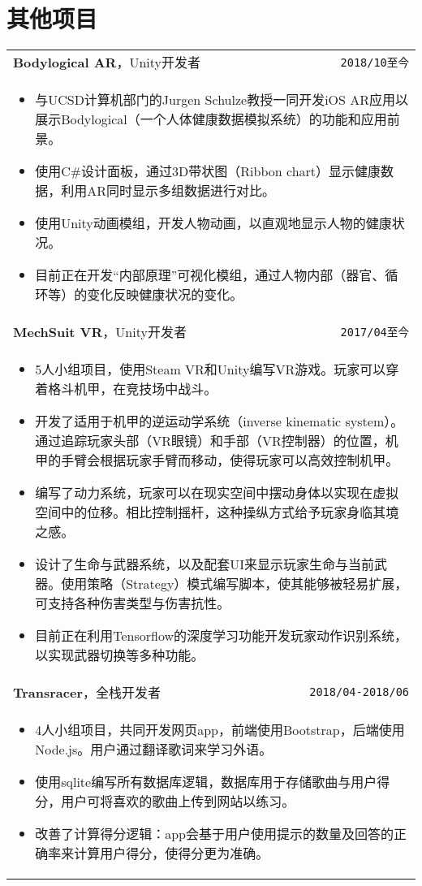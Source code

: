 \documentclass[UTF8]{ctexart}
\newcommand{\itemcols}[1]{
	\multicolumn{2}{p{\dimexpr \linewidth-2\tabcolsep}}{
		\begin{itemize}
			#1
		\end{itemize}
	}
}
\begin{document}
	\section{其他项目}
	\smallskip
	\noindent
	\begin{tabularx}{\linewidth}{X r}
		\textbf{\large Bodylogical AR}，Unity开发者 & \texttt{2018/10至今} \\
		\itemcols{
			\item 与UCSD计算机部门的Jurgen Schulze教授一同开发iOS AR应用以展示Bodylogical（一个人体健康数据模拟系统）的功能和应用前景。
			\item 使用C\#设计面板，通过3D带状图（Ribbon chart）显示健康数据，利用AR同时显示多组数据进行对比。
			\item 使用Unity动画模组，开发人物动画，以直观地显示人物的健康状况。
			\item 目前正在开发“内部原理”可视化模组，通过人物内部（器官、循环等）的变化反映健康状况的变化。
		} \\
		
		\textbf{\large MechSuit VR}，Unity开发者 & \texttt{2017/04至今} \\
		\itemcols{
			\item 5人小组项目，使用Steam VR和Unity编写VR游戏。玩家可以穿着格斗机甲，在竞技场中战斗。
			\item 开发了适用于机甲的逆运动学系统（inverse kinematic system）。通过追踪玩家头部（VR眼镜）和手部（VR控制器）的位置，机甲的手臂会根据玩家手臂而移动，使得玩家可以高效控制机甲。
			\item 编写了动力系统，玩家可以在现实空间中摆动身体以实现在虚拟空间中的位移。相比控制摇杆，这种操纵方式给予玩家身临其境之感。
			\item 设计了生命与武器系统，以及配套UI来显示玩家生命与当前武器。使用策略（Strategy）模式编写脚本，使其能够被轻易扩展，可支持各种伤害类型与伤害抗性。
			\item 目前正在利用Tensorflow的深度学习功能开发玩家动作识别系统，以实现武器切换等多种功能。
		} \\
		
		\textbf{\large Transracer}，全栈开发者 & \texttt{2018/04-2018/06} \\
		\itemcols{
			\item 4人小组项目，共同开发网页app，前端使用Bootstrap，后端使用Node.js。用户通过翻译歌词来学习外语。
			\item 使用sqlite编写所有数据库逻辑，数据库用于存储歌曲与用户得分，用户可将喜欢的歌曲上传到网站以练习。
			\item 改善了计算得分逻辑：app会基于用户使用提示的数量及回答的正确率来计算用户得分，使得分更为准确。
		} \\
		

\end{tabularx}
\end{document}
